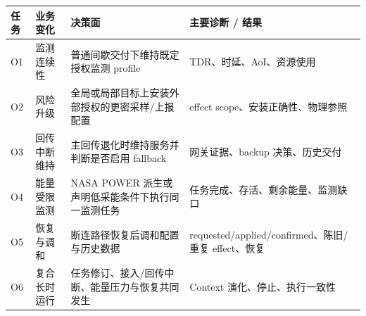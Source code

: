 \begin{tabular}{p{}p{}p{}p{}}
\toprule
任务 & 业务变化 & 决策面 & 主要诊断 / 结果 \\
\midrule
O1 & 监测连续性 & 普通间歇交付下维持既定授权监测 profile & TDR、时延、AoI、资源使用 \\
O2 & 风险升级 & 全局或局部目标上安装外部授权的更密采样/上报配置 & effect scope、安装正确性、物理参照 \\
O3 & 回传中断维持 & 主回传退化时维持服务并判断是否启用 fallback & 网关证据、backup 决策、历史交付 \\
O4 & 能量受限监测 & NASA POWER 派生或声明低采能条件下执行同一监测任务 & 任务完成、存活、剩余能量、监测缺口 \\
O5 & 恢复与调和 & 断连路径恢复后调和配置与历史数据 & requested/applied/confirmed、陈旧/重复 effect、恢复 \\
O6 & 复合长时运行 & 任务修订、接入/回传中断、能量压力与恢复共同发生 & Context 演化、停止、执行一致性 \\
\bottomrule
\end{tabular}
